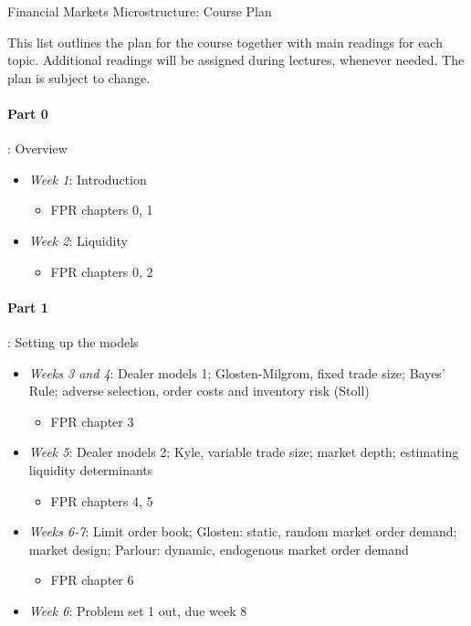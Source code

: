 \documentclass{article}
\begin{document}
\begin{center}
	{\huge Financial Markets Microstructure: Course Plan}
\end{center}
\bigskip

This list outlines the plan for the course together with main readings for each topic. Additional readings will be assigned during lectures, whenever needed. The plan is subject to change.
\medskip

\paragraph{Part 0}: Overview
\begin{itemize}
	\item \textit{Week 1}: Introduction
	\begin{itemize}
		\item FPR chapters 0, 1
	\end{itemize}
	\item \textit{Week 2}: Liquidity
	\begin{itemize}
		\item FPR chapters 0, 2
	\end{itemize}
\end{itemize}

\medskip 
\paragraph{Part 1}: Setting up the models
\begin{itemize}
	\item \textit{Weeks 3 and 4}: Dealer models 1; {Glosten-Milgrom}, fixed trade size; Bayes' Rule; adverse selection, order costs and inventory risk ({Stoll})
	\begin{itemize}
		\item FPR chapter 3
	\end{itemize}
	\item \textit{Week 5}: Dealer models 2; {Kyle}, variable trade size; market depth; estimating liquidity determinants
	\begin{itemize}
		\item FPR chapters 4, 5
	\end{itemize}
	\item \textit{Weeks 6-7}: Limit order book; {Glosten}: static, random market order demand; market design; {Parlour}: dynamic, endogenous market order demand
	\begin{itemize}
		\item FPR chapter 6
	\end{itemize}
	\item \textit{Week 6}: Problem set 1 out, due week 8
\end{itemize}
\end{document}

